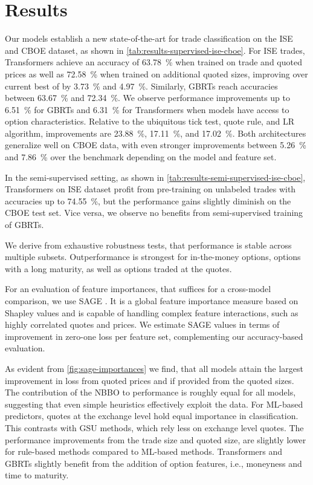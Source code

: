 \section{Results}

Our models establish a new state-of-the-art for trade classification on the \gls{ISE} and \gls{CBOE} dataset, as shown in \cref{tab:results-supervised-ise-cboe}. For \gls{ISE} trades, Transformers achieve an accuracy of \SI{63.78}{\percent} when trained on trade and quoted prices as well as \SI{72.58}{\percent} when trained on additional quoted sizes, improving over current best of \textcite[][]{grauerOptionTradeClassification2022} by \SI{3.73}{\percent} and \SI{4.97}{\percent}. Similarly, \glspl{GBRT} reach accuracies between \SI{63.67}{\percent} and \SI{72.34}{\percent}. We observe performance improvements up to \SI{6.51}{\percent} for \glspl{GBRT} and \SI{6.31}{\percent} for Transformers when models have access to option characteristics. Relative to the ubiquitous tick test, quote rule, and \gls{LR} algorithm, improvements are \SI{23.88}{\percent}, \SI{17.11}{\percent}, and \SI{17.02}{\percent}. Both architectures generalize well on \gls{CBOE} data, with even stronger improvements between \SI{5.26}{\percent} and \SI{7.86}{\percent} over the benchmark depending on the model and feature set. 

In the semi-supervised setting, as shown in \cref{tab:results-semi-supervised-ise-cboe}, Transformers on \gls{ISE} dataset profit from pre-training on unlabeled trades with accuracies up to \SI{74.55}{\percent}, but the performance gains slightly diminish on the \gls{CBOE} test set. Vice versa, we observe no benefits from semi-supervised training of \glspl{GBRT}.

We derive from exhaustive robustness tests, that performance is stable across multiple subsets. Outperformance is strongest for in-the-money options, options with a long maturity, as well as options traded at the quotes.

For an evaluation of feature importances, that suffices for a cross-model comparison, we use \gls{SAGE} \autocite{covertUnderstandingGlobalFeature2020}. It is a global feature importance measure based on Shapley values and is capable of handling complex feature interactions, such as highly correlated quotes and prices. We estimate \gls{SAGE} values in terms of improvement in zero-one loss per feature set, complementing our accuracy-based evaluation.

As evident from \cref{fig:sage-importances} we find, that all models attain the largest improvement in loss from quoted prices and if provided from the quoted sizes. The contribution of the \gls{NBBO} to performance is roughly equal for all models, suggesting that even simple heuristics effectively exploit the data. For \gls{ML}-based predictors, quotes at the exchange level hold equal importance in classification. This contrasts with \gls{GSU} methods, which rely less on exchange level quotes.  The performance improvements from the trade size and quoted size, are slightly lower for rule-based methods compared to \gls{ML}-based methods. Transformers and \glspl{GBRT} slightly benefit from the addition of option features, i.e., moneyness and time to maturity. 

